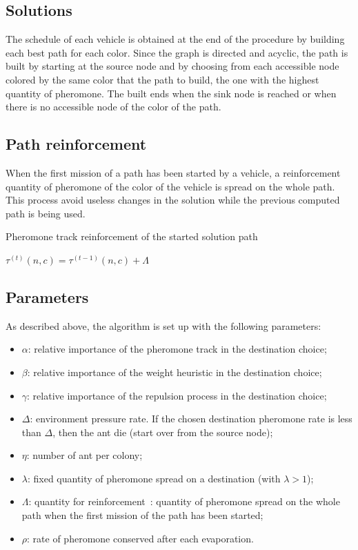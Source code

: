 \documentclass[a4paper,10pt]{article}
\begin{document}
\subsection{Solutions}
The schedule of each vehicle is obtained at the end of the procedure by building each best path for each color. Since the graph is directed and acyclic, the path is built by starting at the source node and by choosing from each accessible node colored by the same color that the path to build, the one with the highest quantity of pheromone. The built ends when the sink node is reached or when there is no accessible node of the color of the path.

\subsection{Path reinforcement}
When the first mission of a path has been started by a vehicle, a reinforcement quantity of pheromone of the color of the vehicle is spread on the whole path. This process avoid useless changes in the solution while the previous computed path is being used.


\begin{algorithm}
\caption{Pheromone track reinforcement of the started solution path}
\begin{algorithmic} 
\label{algoReinforcement}
\STATE $\tau^{(t)}(n,c) =  \tau^{(t-1)}(n,c) + \Lambda$
\ENDFOR
\end{algorithmic}
\end{algorithm}

\subsection{Parameters}
As described above, the algorithm is set up with the following parameters:

\begin{itemize}
 \item $\alpha$: relative importance of the pheromone track in the destination choice;
 \item $\beta$:  relative importance of the weight heuristic in the destination choice;
 \item $\gamma$: relative importance of the repulsion process in the destination choice;
 \item $\Delta$: environment pressure rate. If the chosen destination pheromone rate is less than $\Delta$, then the ant die (start over from the source node);
 \item $\eta$: number of ant per colony;
 \item $\lambda$: fixed quantity of pheromone spread on a destination (with $\lambda > 1$);
 \item $\Lambda$: quantity for reinforcement : quantity of pheromone spread on the whole path when the first mission of the path has been started;
 \item $\rho$: rate of pheromone conserved after each evaporation.
\end{itemize}
\end{document}
